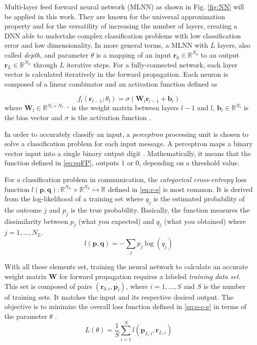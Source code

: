 \documentclass[conference]{IEEEtran}
\begin{document}
Multi-layer feed forward neural network (MLNN) as shown in Fig. \ref{fig:NN} will be applied in this work. They are known for the universal approximation property \cite{b9} and for the versatility of increasing the number of layers, creating a DNN able to undertake complex classification problems with low classification error and low dimensionality. In more general terms, a MLNN with $L$ layers, also called \textit{depth}, and parameter $\theta$ is a mapping of an input $\textbf{r}_0 \in \mathbb{R}^{N_0}$ to an output $\textbf{r}_L \in \mathbb{R}^{N_L}$ through $L$ iterative steps. For a fully-connected network, each layer vector is calculated iteratively in the forward propagation. Each neuron is composed of a linear combinator and an activation function defined as 

\begin{equation}\label{eq:eqFP}
	f_{l}\left( \textbf{r}_{l-1};\theta _{l}\right) = \sigma \left( \textbf{W}_{l}\textbf{r}_{l-1}+\textbf{b}_{l}\right)
\end{equation}
where $\textbf{W}_{l}\in \mathbb{R} ^{N_{l}\times N_{l-1}}$ is the weight matrix between layers $l-1$ and $l$,  $\textbf{b}_{l}\in \mathbb{R} ^{N_l}$ is the bias vector and $\sigma$ is the activation function \cite{b2}.

In order to accurately classify an input, a \textit{perceptron} processing unit is chosen to solve a classification problem for each input message. A perceptron maps a binary vector input into a single binary output digit \cite{b8}. Mathematically, it means that the function defined in \eqref{eq:eqFP}, outputs $1$ or $0$, depending on a threshold value.

For a classification problem in communication, the \textit{categorical cross-entropy} loss function $l(\textbf{p},\textbf{q}):\mathbb{R} ^{N_L}\times \mathbb{R} ^{N_L}\mapsto \mathbb{R}$ defined in \eqref{eq:c-e} is most common. It is derived from the log-likelihood of a training set where $q_j$ is the estimated probability of the outcome $j$ and $p_{j}$ is the true probability. Basically, the function measures the dissimilarity between $p_{j}$ (what you expected) and $q_{j}$ (what you obtained) \cite{b10} where $j=1,...,N_L$.
\begin{equation}\label{eq:c-e}
	l(\textbf{p},\textbf{q})=-\sum _{j}p_{j}\log \left( q_{j}\right)
\end{equation}

With all these elements set, training the neural network to calculate an accurate weight matrix $\textbf{W}$ for forward propagation requires a labeled \textit{training data set}. This set is composed of pairs $ (\textbf{r}_{0,i}, \textbf{p}_i) $, where $i=1,...,S$ and $S$ is the number of training sets. It matches the input and its respective desired output. The objective is to minimize the overall loss function defined in \eqref{eq:o-c-e} in terms of the parameter $\theta$ \cite{b2}. 
\begin{equation}\label{eq:o-c-e}
L\left( \theta \right) =\dfrac {1}{S}\sum ^{S}_{i=1}l\left( \textbf{p}_{L,i},\textbf{r}_{L,i}\right)	
\end{equation}  
\end{document}
